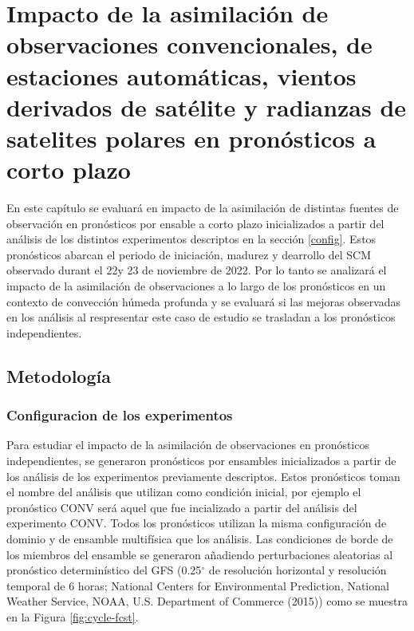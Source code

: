 \documentclass[12pt,oneside]{reedthesis}
\begin{document}
\hypertarget{impacto-de-la-asimilaciuxf3n-de-observaciones-convencionales-de-estaciones-automuxe1ticas-vientos-derivados-de-satuxe9lite-y-radianzas-de-satelites-polares-en-pronuxf3sticos-a-corto-plazo}{%
\chapter{Impacto de la asimilación de observaciones convencionales, de estaciones automáticas, vientos derivados de satélite y radianzas de satelites polares en pronósticos a corto plazo}\label{impacto-de-la-asimilaciuxf3n-de-observaciones-convencionales-de-estaciones-automuxe1ticas-vientos-derivados-de-satuxe9lite-y-radianzas-de-satelites-polares-en-pronuxf3sticos-a-corto-plazo}}

En este capítulo se evaluará en impacto de la asimilación de distintas fuentes de observación en pronósticos por ensable a corto plazo inicializados a partir del análisis de los distintos experimentos descriptos en la sección \ref{config}. Estos pronósticos abarcan el periodo de iniciación, madurez y dearrollo del SCM observado durant el 22y 23 de noviembre de 2022. Por lo tanto se analizará el impacto de la asimilación de observaciones a lo largo de los pronósticos en un contexto de convección húmeda profunda y se evaluará si las mejoras observadas en los análisis al respresentar este caso de estudio se trasladan a los pronósticos independientes.

\hypertarget{metodologuxeda-1}{%
\section{Metodología}\label{metodologuxeda-1}}

\hypertarget{configuracion-de-los-experimentos}{%
\subsection{Configuracion de los experimentos}\label{configuracion-de-los-experimentos}}

Para estudiar el impacto de la asimilación de observaciones en pronósticos independientes, se generaron pronósticos por ensambles inicializados a partir de los análisis de los experimentos previamente descriptos. Estos pronósticos toman el nombre del análisis que utilizan como condición inicial, por ejemplo el pronóstico CONV será aquel que fue incializado a partir del análisis del experimento CONV. Todos los pronósticos utilizan la misma configuración de dominio y de ensamble multifísica que los análisis. Las condiciones de borde de los miembros del ensamble se generaron añadiendo perturbaciones aleatorias al pronóstico determinístico del GFS (0.25\(^{\circ}\) de resolución horizontal y resolución temporal de 6 horas; National Centers for Environmental Prediction, National Weather Service, NOAA, U.S. Department of Commerce (2015)) como se muestra en la Figura \ref{fig:cycle-fcst}.
\end{document}
